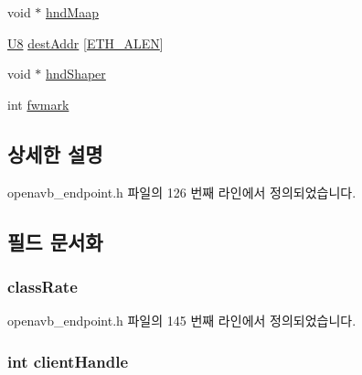 \begin{DoxyCompactItemize}
\item 
void $\ast$ \hyperlink{structclient_stream__t_a1b2433a27b79ec03bd3274c4c865870e}{hnd\+Maap}
\item 
\hyperlink{openavb__types__base__pub_8h_aa63ef7b996d5487ce35a5a66601f3e73}{U8} \hyperlink{structclient_stream__t_a016f2167ae2143dcacd762c10be2f614}{dest\+Addr} \mbox{[}\hyperlink{avb__avtp_8h_a9822d89774e0d6ddaa06503950130423}{E\+T\+H\+\_\+\+A\+L\+EN}\mbox{]}
\item 
void $\ast$ \hyperlink{structclient_stream__t_ac950fbf2d5bb043e6c62591762bbd918}{hnd\+Shaper}
\item 
int \hyperlink{structclient_stream__t_a730462c5f9401195f3208e5ebbaadba4}{fwmark}
\end{DoxyCompactItemize}


\subsection{상세한 설명}


openavb\+\_\+endpoint.\+h 파일의 126 번째 라인에서 정의되었습니다.



\subsection{필드 문서화}
\subsubsection[{\texorpdfstring{class\+Rate}{classRate}}]{ class\+Rate}\hypertarget{structclient_stream__t_a0bf28249cb23ce65c155693440118df5}{}\label{structclient_stream__t_a0bf28249cb23ce65c155693440118df5}


openavb\+\_\+endpoint.\+h 파일의 145 번째 라인에서 정의되었습니다.

\subsubsection[{\texorpdfstring{client\+Handle}{clientHandle}}]{\setlength{\rightskip}{0pt plus 5cm}int client\+Handle}\hypertarget{structclient_stream__t_a8bcb50d9f1c7cb3cf13f1ca811977ef8}{}\label{structclient_stream__t_a8bcb50d9f1c7cb3cf13f1ca811977ef8}


